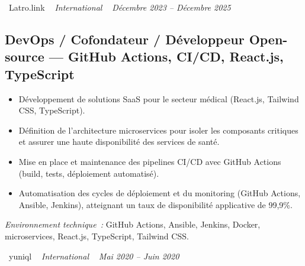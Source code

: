\documentclass[10pt,a4paper]{article}
\begin{document}
\vspace{10pt}

\noindent\textcolor{primary}{ \faBuilding\ Latro.link} \quad
\textit{ \small \textcolor{darkgray}{ \faMapMarker\ } International } \hfill
\textit{ \small \textcolor{darkgray}{ \faCalendar\ } Décembre 2023 -- Décembre 2025 }

\vspace{4pt}

\subsection*{DevOps / Cofondateur / Développeur Open-source --- GitHub Actions, CI/CD, React.js, TypeScript}
\color{darkgray}
\begin{itemize}
  \item Développement de solutions SaaS pour le secteur médical (React.js, Tailwind CSS, TypeScript).
  \item Définition de l'architecture microservices pour isoler les composants critiques et assurer une haute disponibilité des services de santé.
  \item Mise en place et maintenance des pipelines CI/CD avec GitHub Actions (build, tests, déploiement automatisé).
  \item Automatisation des cycles de déploiement et du monitoring (GitHub Actions, Ansible, Jenkins), atteignant un taux de disponibilité applicative de 99,9\%.
\end{itemize}
\textit{Environnement technique~:} GitHub Actions, Ansible, Jenkins, Docker, microservices, React.js, TypeScript, Tailwind CSS.

\vspace{10pt}

\noindent\textcolor{primary}{ \faBuilding\ yuniql} \quad
\textit{ \small \textcolor{darkgray}{ \faMapMarker\ } International } \hfill
\textit{ \small \textcolor{darkgray}{ \faCalendar\ } Mai 2020 -- Juin 2020 }

\vspace{4pt}
\end{document}
